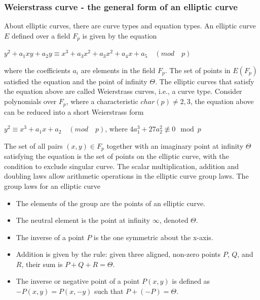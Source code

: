 \subsubsection{Weierstrass curve - the general form of an elliptic curve}
About elliptic curves, there are curve types and equation types. An elliptic curve $E$ defined over a field $F_p$ is given by the equation

\hspace{0.25cm}
\begin{center}
  $y^2 + a_1xy + a_2y \equiv x^3 + a_3x^2 + a_3x^2 + a_4x + a_5 \quad (mod \quad p)$\\
\end{center}
\hspace{0.25cm}

where the coefficients $a_i$ are elements in the field $F_p$. The set of points in $E(F_p)$ satisfied the equation and the point of infinity $\Theta$. The elliptic curves that satisfy the equation above are called Weierstrass curves, i.e., a curve type. Consider polynomials over $F_p$, where a characteristic $char(p) \neq 2,3$, the equation above can be reduced into a short Weierstrass form

\hspace{0.25cm}
\begin{center}
  $y^2 \equiv x^3 + a_1x + a_2 \quad (mod \quad p)$, where $4a_1^3 + 27a_2^2 \not\equiv 0 \mod p$
\end{center}
\hspace{0.25cm}

The set of all pairs $(x,y) \in F_p$ together with an imaginary point at infinity $\Theta$ satisfying the equation is the set of points on the elliptic curve, with the condition to exclude singular curve. The scalar multiplication, addition and doubling laws allow arithmetic operations in the elliptic curve group laws. The group laws for an elliptic curve

\begin{itemize}
  \item The elements of the group are the points of an elliptic curve.
  \item The neutral element is the point at infinity $\infty$, denoted $\Theta$.
  \item The inverse of a point $P$ is the one symmetric about the x-axis.
  \item Addition is given by the rule: given three aligned, non-zero points $P$, $Q$, and $R$, their sum is $P + Q + R = \Theta$.
  \item The inverse or negative point of a point $P(x,y)$ is defined as $-P(x,y) = P(x,-y)$ such that $P + (-P) = \Theta$.
\end{itemize}

